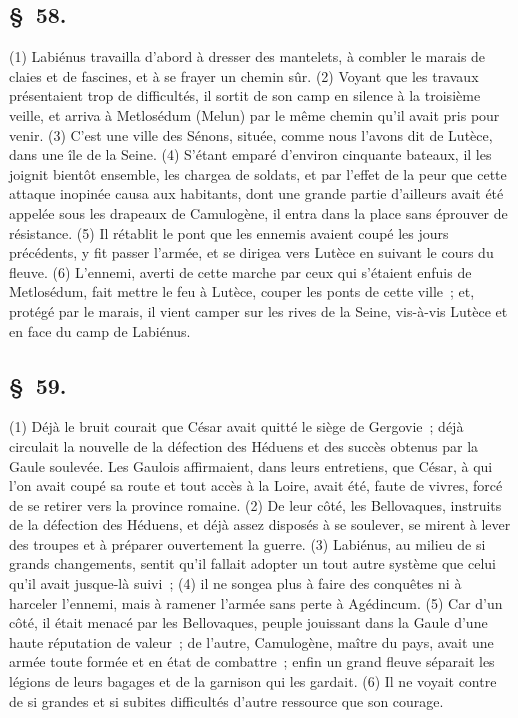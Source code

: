\documentclass[french,twoside]{book} %
\begin{document}
\subsection[{§ 58.}]{ \textsc{§ 58.} }
\noindent (1) Labiénus travailla d’abord à dresser des mantelets, à combler le marais de claies et de fascines, et à se frayer un chemin sûr. (2) Voyant que les travaux présentaient trop de difficultés, il sortit de son camp en silence à la troisième veille, et arriva à Metlosédum (Melun) par le même chemin qu’il avait pris pour venir. (3) C'est une ville des Sénons, située, comme nous l’avons dit de Lutèce, dans une île de la Seine. (4) S'étant emparé d’environ cinquante bateaux, il les joignit bientôt ensemble, les chargea de soldats, et par l’effet de la peur que cette attaque inopinée causa aux habitants, dont une grande partie d’ailleurs avait été appelée sous les drapeaux de Camulogène, il entra dans la place sans éprouver de résistance. (5) Il rétablit le pont que les ennemis avaient coupé les jours précédents, y fit passer l’armée, et se dirigea vers Lutèce en suivant le cours du fleuve. (6) L'ennemi, averti de cette marche par ceux qui s’étaient enfuis de Metlosédum, fait mettre le feu à Lutèce, couper les ponts de cette ville ; et, protégé par le marais, il vient camper sur les rives de la Seine, vis-à-vis Lutèce et en face du camp de Labiénus.
\subsection[{§ 59.}]{ \textsc{§ 59.} }
\noindent (1) Déjà le bruit courait que César avait quitté le siège de Gergovie ; déjà circulait la nouvelle de la défection des Héduens et des succès obtenus par la Gaule soulevée. Les Gaulois affirmaient, dans leurs entretiens, que César, à qui l’on avait coupé sa route et tout accès à la Loire, avait été, faute de vivres, forcé de se retirer vers la province romaine. (2) De leur côté, les Bellovaques, instruits de la défection des Héduens, et déjà assez disposés à se soulever, se mirent à lever des troupes et à préparer ouvertement la guerre. (3) Labiénus, au milieu de si grands changements, sentit qu’il fallait adopter un tout autre système que celui qu’il avait jusque-là suivi ; (4) il ne songea plus à faire des conquêtes ni à harceler l’ennemi, mais à ramener l’armée sans perte à Agédincum. (5) Car d’un côté, il était menacé par les Bellovaques, peuple jouissant dans la Gaule d’une haute réputation de valeur ; de l’autre, Camulogène, maître du pays, avait une armée toute formée et en état de combattre ; enfin un grand fleuve séparait les légions de leurs bagages et de la garnison qui les gardait. (6) Il ne voyait contre de si grandes et si subites difficultés d’autre ressource que son courage.
\end{document}
